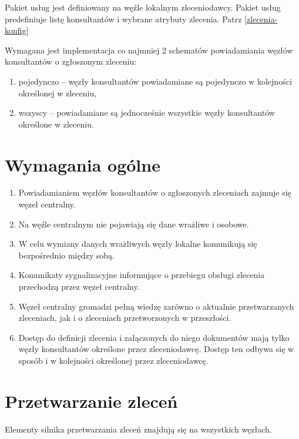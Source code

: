 \documentclass[a4paper]{report}
\begin{document}
Pakiet usług jest definiowany na węźle lokalnym zleceniodawcy. Pakiet usług predefiniuje listę konsultantów i wybrane atrybuty zlecenia. Patrz \ref{zlecenia-konfig}

Wymagana jest implementacja co najmniej 2 schematów powiadamiania węzłów konsultantów o zgłoszonym zleceniu:
\begin{enumerate}
 \item pojedynczo -- węzły konsultantów powiadamiane są pojedynczo w kolejności określonej w zleceniu,
 \item wszyscy -- powiadamiane są jednocześnie wszystkie węzły konsultantów określone w zleceniu.
\end{enumerate}

\section{Wymagania ogólne}
\begin{enumerate}
\item Powiadamianiem węzłów konsultantów o zgłoszonych zleceniach zajmuje się węzeł centralny.
\item Na węźle centralnym nie pojawiają się dane wrażliwe i osobowe.
\item W celu wymiany danych wrażliwych węzły lokalne komunikują się bezpośrednio między sobą.
\item Komunikaty sygnalizacyjne informujące o przebiegu obsługi zlecenia przechodzą przez węzeł centralny.
\item Węzeł centralny gromadzi pełną wiedzę zarówno o aktualnie przetwarzanych zleceniach, jak i o zleceniach przetworzonych w przeszłości.
\item Dostęp do definicji zlecenia i załączonych do niego dokumentów mają tylko węzły konsultantów określone przez zleceniodawcę. Dostęp ten odbywa się w sposób i w kolejności określonej przez zleceniodawcę.
\end{enumerate}

\section{Przetwarzanie zleceń}

Elementy silnika przetwarzania zleceń znajdują się na wszystkich węzłach.
\end{document}
